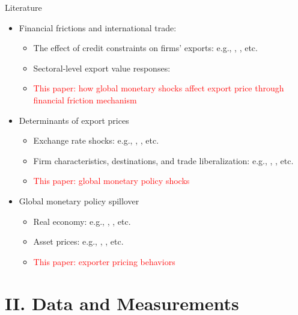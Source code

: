 \documentclass[10pt]{beamer}
\begin{document}
\begin{frame}{Literature}
\begin{itemize}
    \item Financial frictions and international trade: 
    \begin{itemize}
       \item The effect of credit constraints on firms' exports: e.g., \cite{manova2013credit}, \cite{manova2015firm}, etc.
        \item Sectoral-level export value responses: \cite{lin2018international}
        \item \textcolor{red}{This paper: how global monetary shocks affect export price through financial friction mechanism}
    \end{itemize}
    \item Determinants of export prices
        \begin{itemize}
        \item Exchange rate shocks: e.g., \cite{amiti2014importers}, \cite{auer2018quality}, etc.
        \item Firm characteristics, destinations, and trade liberalization: e.g., \cite{manova2012export}, \cite{fan2015trade}, etc.
        \item \textcolor{red}{This paper: global monetary policy shocks}
    \end{itemize}
    \item Global monetary policy spillover
        \begin{itemize}
        \item Real economy: e.g., \cite{bluedorn2011open}, \cite{di2023impact}, etc.
        \item Asset prices: e.g., \cite{rogers2014evaluating}, \cite{miranda2020us}, etc.
        \item \textcolor{red}{This paper: exporter pricing behaviors}
    \end{itemize}
\end{itemize}

\end{frame}

\section{II. Data and Measurements}
\end{document}
